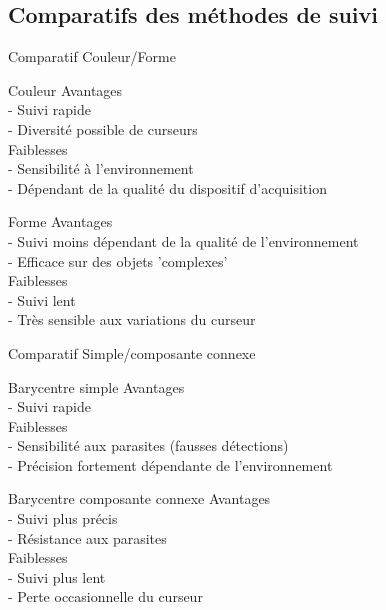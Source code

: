 \documentclass{beamer}
\begin{document}
		\subsection{Comparatifs des méthodes de suivi}
		\begin{frame}{Comparatif Couleur/Forme}
		\pause
			\begin{block}{Couleur}
				Avantages \\
				- Suivi rapide \\
				- Diversité possible de curseurs \\
				Faiblesses \\
				- Sensibilité à l'environnement\\
				- Dépendant de la qualité du dispositif d'acquisition\\
			\end{block}
			\pause
			\begin{block}{Forme}
				Avantages \\
				- Suivi moins dépendant de la qualité de l'environnement \\
				- Efficace sur des objets 'complexes'\\
				Faiblesses \\
				- Suivi  lent \\
				- Très sensible aux variations du curseur\\
			\end{block}
		\end{frame}
		\begin{frame}{Comparatif Simple/composante connexe}
		\pause
			\begin{block}{Barycentre simple}
				Avantages \\
				- Suivi rapide \\
				Faiblesses \\
				- Sensibilité aux parasites (fausses détections)\\
				- Précision fortement dépendante de l'environnement\\
			\end{block}
			\pause
			\begin{block}{Barycentre composante connexe}
				Avantages \\
				- Suivi plus précis \\
				- Résistance aux parasites \\
				Faiblesses \\
				- Suivi plus lent \\
				- Perte occasionnelle du curseur
			\end{block}
		\end{frame}
\end{document}
